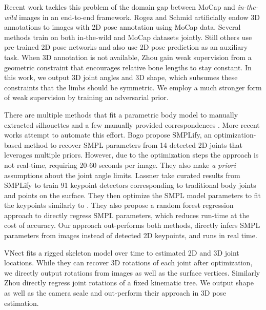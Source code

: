 \documentclass[10pt,twocolumn,letterpaper]{article}
\begin{document}
Recent work tackles this problem of the domain gap between
MoCap and \emph{in-the-wild} images in an end-to-end framework. Rogez and Schmid
\cite{RogezMocap} artificially endow 3D annotations to images with 2D pose annotation using
MoCap data. 
Several methods \cite{Mehta17,VNect,Xingyi2017} train on both in-the-wild and MoCap
datasets jointly. 
Still others \cite{Mehta17,VNect} use pre-trained 2D pose networks and also use 
2D pose prediction as an auxiliary task.
When 3D annotation is not available, Zhou \etal \cite{Xingyi2017} gain weak
supervision from a geometric constraint that encourages relative bone lengths to
stay constant. In this work, we output 3D joint angles and 3D shape, which subsumes
these constraints that the limbs should be symmetric. We employ a much stronger
form of weak supervision by training an adversarial prior.

There are multiple methods that fit a parametric body model to manually extracted
silhouettes \cite{Chen:ECCV:2010} and a few manually provided correspondences
\cite{ Guan:2009,Hasler:2010}. More recent works attempt to automate this
effort. Bogo \etal \cite{SMPLify} propose SMPLify, an optimization-based method to
recover SMPL parameters from 14 detected 2D joints that leverages multiple
priors. 
However, due to the optimization steps the approach is not real-time,
requiring 20-60 seconds per image. They also make \emph{a priori} assumptions about
the joint angle limits. 
Lassner \etal \cite{UP} take curated results from SMPLify to train 91
keypoint detectors corresponding to traditional body joints and points on the surface.
They then optimize the SMPL model parameters to fit the keypoints
similarly to \cite{SMPLify}.
They also propose a random forest regression approach to directly regress SMPL parameters, which reduces run-time at the cost
of accuracy. 
Our approach out-performs both methods, directly infers SMPL parameters
from images instead of detected 2D keypoints, and runs in real time.

VNect \cite{VNect} fits a rigged skeleton model over time to estimated
2D and 3D joint locations.
While they can recover 3D rotations of each joint after optimization, we directly output rotations from
images as well as the surface vertices. Similarly Zhou \etal \cite{Xingyi2016} directly
regress joint rotations of a fixed kinematic tree. We output shape as well as
the camera scale and out-perform their approach in 3D pose estimation.
\end{document}
